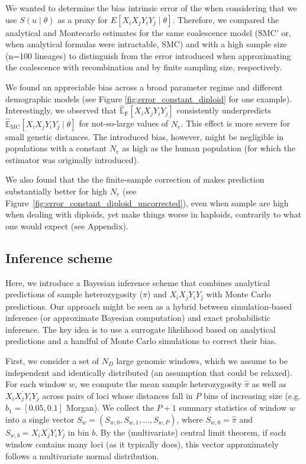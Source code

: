 \documentclass[12pt]{article}
\begin{document}
We wanted to determine the bias intrinsic error of the  when considering that we use $S(u \mid \theta)$ as a proxy for $E[X_iX_jY_iY_j \mid \theta]$. Therefore, we compared the analytical and Montecarlo estimates for the same coalescence model (SMC' or, when analytical formulas were intractable, SMC) and with a high sample size (n=100 lineages) to distinguish from the error introduced when approximating the coalescence with recombination and by finite sampling size, respectively.

We found an appreciable bias across a broad parameter regime and different demographic models (see Figure \ref{fig:error_constant_diploid} for one example). Interestingly, we observed  that $\widehat{\mathbb E}_{\mathrm{F}}[X_iX_jY_iY_j]$ consistently underpredicts $\widehat{\mathbb E}_{\mathrm{MC}}[X_iX_jY_iY_j \mid \theta]$ for not-so-large values of $N_e$. This effect is more severe for small genetic distances. The introduced bias, however, might be negligible in populations with a constant $N_e$ as high as the human population (for which the estimator was originally introduced).

We also found that the the finite-sample correction of \citet{Fournier_2023} makes prediction substantially better for high $N_e$ (see Figure~\ref{fig:error_constant_diploid_uncorrected}), even when sample are high when dealing with diploids, yet make things worse in haploids, contrarily to what one would expect (see Appendix).

\subsection{Inference scheme}

Here, we introduce a Bayesian inference scheme that combines analytical predictions of sample heterozygosity ($\pi$) and $X_iX_jY_iY_j$ with Monte Carlo predictions. Our approach might be seen as a hybrid between simulation-based inference (or approximate Bayesian computation) and exact probabilistic inference. The key idea is to use a surrogate likelihood based on analytical predictions and a handful of Monte Carlo simulations to correct their bias.

First, we consider a set of $N_D$ large genomic windows, which we assume to be independent and identically distributed (an assumption that could be relaxed). For each window $w$, we compute the mean sample heterozygosity $\hat\pi$ as well as $\overline{X_iX_jY_iY_j}$ across pairs of loci whose distances fall in $P$ bins of increasing size (e.g. $b_1=[0.05, 0.1]$ Morgan). We collect the $P+1$ summary statistics of window $w$ into a single vector $S_w = (S_{w,0}, S_{w,1}, \dots, S_{w,P})$, where $S_{w,0} = \hat\pi$ and $S_{w,b} = \overline{X_iX_jY_iY_j}$ in bin $b$. By the (multivariate) central limit theorem, if each window contains many loci (as it typically does), this vector approximately follows a multivariate normal distribution.
\end{document}
